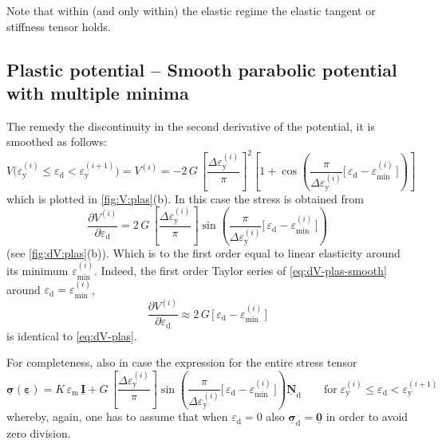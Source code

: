 \documentclass[fleqn]{goose-article}
\newcommand\T[1]{\underline{\bm{{#1}}}}
\begin{document}
Note that within (and only within) the elastic regime the
elastic tangent or stiffness tensor holds.

\subsection{Plastic potential -- Smooth parabolic potential with multiple minima}

The remedy the discontinuity in the second derivative of the potential, it is smoothed as follows:
\begin{equation}
    \label{eq:V-plas-smooth}
    V \big(
        \varepsilon_\mathrm{y}^{(i)} \leq \varepsilon_\mathrm{d} < \varepsilon_\mathrm{y}^{(i+1)}
    \big)
    =
    V^{(i)}
    =
    - 2 \, G \,
    \left[ \frac{\Delta \varepsilon_\mathrm{y}^{(i)}}{\pi} \right]^2
    \left[
        1 + \cos \left(
          \frac{ \pi }{ \Delta \varepsilon_\mathrm{y}^{(i)} }
          \Big[\, \varepsilon_\mathrm{d} - \varepsilon_\mathrm{min}^{(i)} \,\Big]
        \right)
    \right]
\end{equation}
which is plotted in \cref{fig:V:plas}(b).
In this case the stress is obtained from
\begin{equation}
    \label{eq:dV-plas-smooth}
    \frac{\partial V^{(i)}}{\partial \varepsilon_\mathrm{d}}
    =
    2 \, G \,
    \left[ \frac{\Delta \varepsilon_\mathrm{y}^{(i)}}{\pi} \right]
    \sin \left(
        \frac{ \pi }{ \Delta \varepsilon_\mathrm{y}^{(i)} }
        \Big[\, \varepsilon_\mathrm{d} - \varepsilon_\mathrm{min}^{(i)} \,\Big]
    \right)
\end{equation}
(see \cref{fig:dV:plas}(b)).
Which is to the first order equal to linear elasticity around its minimum
$\varepsilon_\mathrm{min}^{(i)}$.
Indeed, the first order Taylor series of \cref{eq:dV-plas-smooth} around
$\varepsilon_\mathrm{d} = \varepsilon_\mathrm{min}^{(i)}$,
\begin{equation}
    \frac{\partial V^{(i)}}{\partial \varepsilon_\mathrm{d}}
    \approx
    2 \, G \, \Big[\, \varepsilon_\mathrm{d} - \varepsilon_\mathrm{min}^{(i)} \,\Big]
\end{equation}
is identical to \cref{eq:dV-plas}.

For completeness, also in case the expression for the entire stress tensor
\begin{equation}
    \T{\sigma} ( \T{\varepsilon} )
    =
    K \, \varepsilon_\mathrm{m} \, \T{I}
    +
    G \,
    \left[ \frac{\Delta \varepsilon_\mathrm{y}^{(i)}}{\pi} \right]
    \sin \left(
        \frac{ \pi }{ \Delta \varepsilon_\mathrm{y}^{(i)} }
        \Big[\, \varepsilon_\mathrm{d} - \varepsilon_\mathrm{min}^{(i)} \,\Big]
    \right)
    \T{N}_\mathrm{d}
    \qquad
    \mathrm{for}
    \;
    \varepsilon_\mathrm{y}^{(i)} \leq \varepsilon_\mathrm{d} < \varepsilon_\mathrm{y}^{(i+1)}
\end{equation}
whereby, again, one has to assume that when $\varepsilon_\mathrm{d} = 0$ also
$\T{\sigma}_\mathrm{d} = \T{0}$ in order to avoid zero division.
\end{document}
